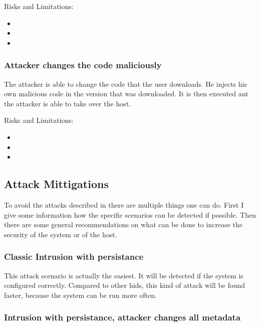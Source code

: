 Risks and Limitations:
\begin{itemize}
	\item {}
	\item {}
	\item {}
\end{itemize}

\subsubsection{Attacker changes the code maliciously}
\label{sec:attack:codechange}

The attacker is able to change the code that the user downloads. He injects his own malicious code in the version that was downloaded. It is then executed ant the attacker is able to take over the host.

Risks and Limitations:
\begin{itemize}
	\item {}
	\item {}
	\item {}
\end{itemize}

\subsection{Attack Mittigations}
\label{sec:mittigations}

To avoid the attacks described in  there are multiple things one can do. First I give some information how the specific scenarios can be detected if possible. Then there are some general recommendations on what can be done to increase the security of the system or of the host.

\subsubsection{Classic Intrusion with persistance}
\label{sec:defense:classic}

This attack scenario is actually the easiest. It will be detected if the system is configured correctly. Compared to other \gls{hids}, this kind of attack will be found faster, because the system can be run more often. 

\subsubsection{Intrusion with persistance, attacker changes all metadata}
\label{sec:defense:changeattr}

